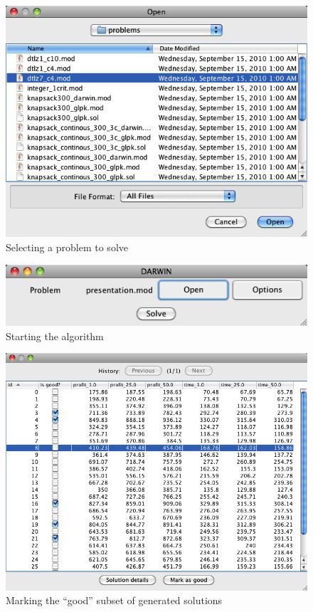 \begin{figure}
  \centering
  \includegraphics[scale=0.7]{img/manual/02_problem_selector}
  \caption{Selecting a problem to solve}
  \label{manual_02_problem_selector}
\end{figure}

\begin{figure}
  \centering
  \includegraphics[scale=0.7]{img/manual/03_problem_selected}
  \caption{Starting the algorithm}
  \label{manual_03_selected}
\end{figure}

\begin{figure}
  \centering
  \includegraphics[scale=0.7]{img/manual/04_marking_solutions}
  \caption{Marking the ``good'' subset of generated solutions}
  \label{manual_04_mark_as_good}
\end{figure}

